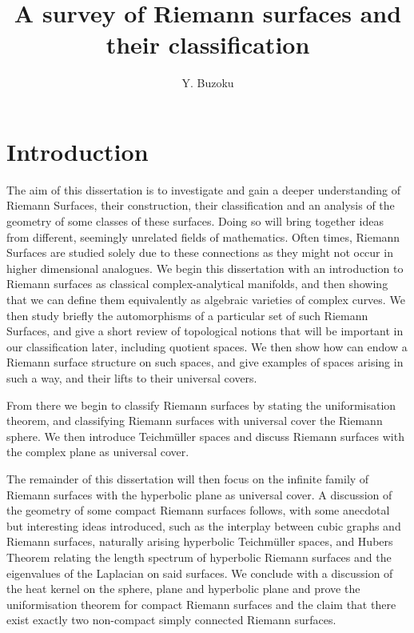 \documentclass[a4paper,12pt]{report}
\title{A survey of Riemann surfaces and their classification}
\author{Y. Buzoku}
\theoremstyle{plain}
\theoremstyle{definition}
\begin{document}
%
\chapter{Introduction}

The aim of this dissertation is to investigate and gain a deeper
understanding of
Riemann Surfaces, their construction, their classification and an analysis
of the
geometry of some classes of these surfaces. Doing so will bring together
ideas
from different, seemingly unrelated fields of mathematics. Often times,
Riemann
Surfaces are studied solely due to these connections as they might not
occur in
higher dimensional analogues. We begin this dissertation with an
introduction to
Riemann surfaces as classical complex-analytical manifolds, and then
showing that
we can define them equivalently as algebraic varieties of complex curves.
We then 
study briefly the automorphisms of a particular set of such Riemann
Surfaces, and 
give a short review of topological notions that will be important in our 
classification later, including quotient spaces. We then show how can
endow a 
Riemann surface structure on such spaces, and give examples of spaces
arising in such a way, and their lifts to their universal covers.

From there we begin to classify Riemann surfaces by stating the
uniformisation 
theorem, and classifying Riemann surfaces with universal cover the Riemann
sphere. We then introduce Teichm\"{u}ller spaces and discuss Riemann
surfaces with the complex plane as universal cover.

The remainder of this dissertation will then focus on the infinite family
of Riemann surfaces with the hyperbolic plane as universal cover. A
discussion of the geometry of some compact Riemann surfaces follows, with
some anecdotal but interesting ideas introduced, such as the interplay
between cubic graphs and Riemann surfaces, naturally arising hyperbolic
Teichm\"{u}ller spaces, and Hubers Theorem relating the length spectrum of
hyperbolic Riemann surfaces and the eigenvalues of the Laplacian on said
surfaces. We conclude with a discussion of the heat kernel on the sphere,
plane and hyperbolic plane and prove the uniformisation theorem for
compact Riemann surfaces and the claim that there exist exactly two
non-compact simply connected Riemann surfaces.
\end{document}
